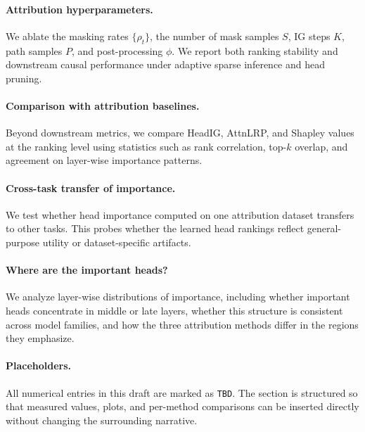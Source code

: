 \paragraph{Attribution hyperparameters.}
We ablate the masking rates $\{\rho_t\}$, the number of mask samples $S$, IG steps $K$, path samples $P$, and post-processing $\phi$. We report both ranking stability and downstream causal performance under adaptive sparse inference and head pruning.

\paragraph{Comparison with attribution baselines.}
Beyond downstream metrics, we compare HeadIG, AttnLRP, and Shapley values at the ranking level using statistics such as rank correlation, top-$k$ overlap, and agreement on layer-wise importance patterns.

\paragraph{Cross-task transfer of importance.}
We test whether head importance computed on one attribution dataset transfers to other tasks. This probes whether the learned head rankings reflect general-purpose utility or dataset-specific artifacts.

\paragraph{Where are the important heads?}
We analyze layer-wise distributions of importance, including whether important heads concentrate in middle or late layers, whether this structure is consistent across model families, and how the three attribution methods differ in the regions they emphasize.

\paragraph{Placeholders.}
All numerical entries in this draft are marked as \texttt{TBD}. The section is structured so that measured values, plots, and per-method comparisons can be inserted directly without changing the surrounding narrative.
